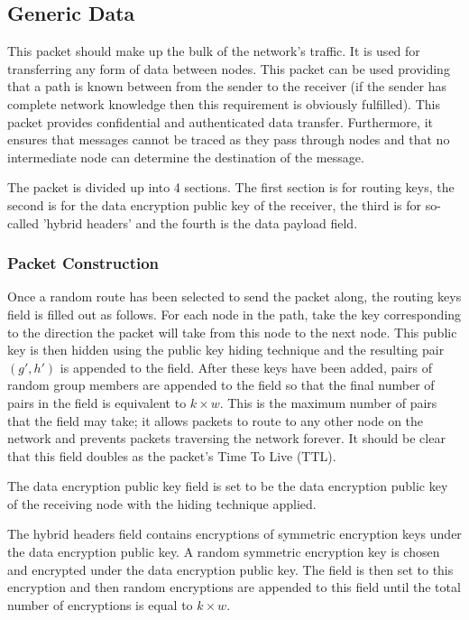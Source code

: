 \documentclass[ %
                    author={Luke Murray},
                supervisor={Dr. Simon Hollis},
                     title={Shadow Peer-to-Peer Networks},
                  subtitle={},
                    degree={MEng},
                      year={2013} ]{thesis}
\begin{document}
\subsection{Generic Data}

This packet should make up the bulk of the network's traffic. It is used for transferring any form of data between nodes. This packet can be used providing that a path is known between from the sender to the receiver (if the sender has complete network knowledge then this requirement is obviously fulfilled). This packet provides confidential and authenticated data transfer. Furthermore, it ensures that messages cannot be traced as they pass through nodes and that no intermediate node can determine the destination of the message.

The packet is divided up into 4 sections. The first section is for routing keys, the second is for the data encryption public key of the receiver, the third is for so-called 'hybrid headers' and the fourth is the data payload field.

\subsubsection{Packet Construction}

Once a random route has been selected to send the packet along, the routing keys field is filled out as follows. For each node in the path, take the key corresponding to the direction the packet will take from this node to the next node. This public key is then hidden using the public key hiding technique and the resulting pair $(g\prime, h\prime)$ is appended to the field. After these keys have been added, pairs of random group members are appended to the field so that the final number of pairs in the field is equivalent to $k \times w$. This is the maximum number of pairs that the field may take; it allows packets to route to any other node on the network and prevents packets traversing the network forever. It should be clear that this field doubles as the packet's Time To Live (TTL).

The data encryption public key field is set to be the data encryption public key of the receiving node with the hiding technique applied.

The hybrid headers field contains encryptions of symmetric encryption keys under the data encryption public key. A random symmetric encryption key is chosen and encrypted under the data encryption public key. The field is then set to this encryption and then random encryptions are appended to this field until the total number of encryptions is equal to $k \times w$.
\end{document}
